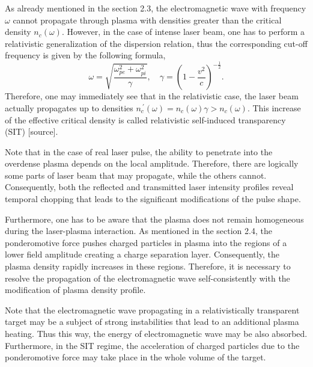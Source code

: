As already mentioned in the section 2.3, the electromagnetic wave with frequency $ \omega $ cannot propagate through plasma with densities greater than the critical density $ n_c \left( \omega \right) $. However, in the case of intense laser beam, one has to perform a relativistic generalization of the dispersion relation, thus the corresponding cut-off frequency is given by the following formula,
\begin{equation}
\label{2.6.1}
\omega = \sqrt{\frac{\omega_{pe}^2 + \omega_{pi}^2}{\gamma}}, \quad \gamma = \left( 1 - \frac{v^{2}}{c} \right)^{-\frac{1}{2}}.
\end{equation}
Therefore, one may immediately see that in the relativistic case, the laser beam actually propagates up to densities $ n_c^{\: \prime} \left( \omega \right) = n_c \left( \omega \right) \gamma > n_c \left( \omega \right) $. This increase of the effective critical density is called relativistic self-induced transparency (SIT) [source].

Note that in the case of real laser pulse, the ability to penetrate into the overdense plasma depends on the local amplitude. Therefore, there are logically some parts of laser beam that may propagate, while the others cannot. Consequently, both the reflected and transmitted laser intensity profiles reveal temporal chopping that leads to the significant modifications of the pulse shape.

Furthermore, one has to be aware that the plasma does not remain homogeneous during the laser-plasma interaction. As mentioned in the section 2.4, the ponderomotive force pushes charged particles in plasma into the regions of a lower field amplitude creating a charge separation layer. Consequently, the plasma density rapidly increases in these regions. Therefore, it is necessary to resolve the propagation of the electromagnetic wave self-consistently with the modification of plasma density profile.

Note that the electromagnetic wave propagating in a relativistically transparent target may be a subject of strong instabilities that lead to an additional plasma heating. Thus this way, the energy of electromagnetic wave may be also absorbed. Furthermore, in the SIT regime, the acceleration of charged particles due to the ponderomotive force may take place in the whole volume of the target.

